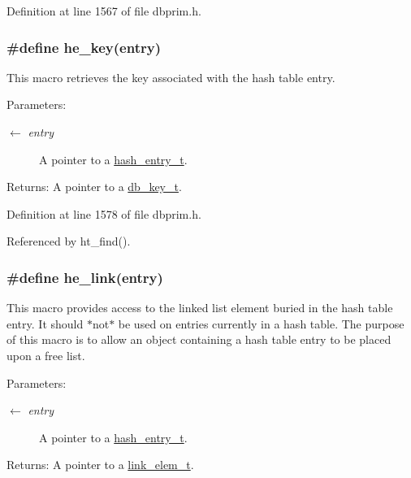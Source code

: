 Definition at line 1567 of file dbprim.h.\hypertarget{group__dbprim__hash_ga43}{
\subsubsection[he\_\-key]{\setlength{\rightskip}{0pt plus 5cm}\#define he\_\-key(entry)}}
\label{group__dbprim__hash_ga43}


This macro retrieves the key associated with the hash table entry.

\begin{Desc}
\item[Parameters:]
\begin{description}
\item[\mbox{$\leftarrow$} {\em entry}]A pointer to a \hyperlink{group__dbprim__hash_ga2}{hash\_\-entry\_\-t}.\end{description}
\end{Desc}
\begin{Desc}
\item[Returns:]A pointer to a \hyperlink{group__dbprim_ga0}{db\_\-key\_\-t}.\end{Desc}


Definition at line 1578 of file dbprim.h.

Referenced by ht\_\-find().\hypertarget{group__dbprim__hash_ga39}{
\subsubsection[he\_\-link]{\setlength{\rightskip}{0pt plus 5cm}\#define he\_\-link(entry)}}
\label{group__dbprim__hash_ga39}


This macro provides access to the linked list element buried in the hash table entry. It should $\ast$not$\ast$ be used on entries currently in a hash table. The purpose of this macro is to allow an object containing a hash table entry to be placed upon a free list.

\begin{Desc}
\item[Parameters:]
\begin{description}
\item[\mbox{$\leftarrow$} {\em entry}]A pointer to a \hyperlink{group__dbprim__hash_ga2}{hash\_\-entry\_\-t}.\end{description}
\end{Desc}
\begin{Desc}
\item[Returns:]A pointer to a \hyperlink{group__dbprim__link_ga1}{link\_\-elem\_\-t}.\end{Desc}


